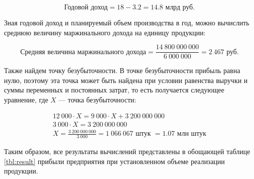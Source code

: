 \begin{equation}
    \textbf{Годовой доход} = 18 - 3.2 = 14.8 \text{ млрд руб.}
\end{equation}

Зная годовой доход и планируемый объем производства в год, можно вычислить среднюю величину маржинального дохода на единицу продукции:

\begin{equation}
    \textbf{Средняя величина маржинального дохода} = \frac{14\ 800\ 000\ 000}{6\ 000\ 000}  = 2\ 467 \text{ руб.}
\end{equation}

Также найдем точку безубыточности. В точке безубыточности прибыль равна нулю, поэтому эта точка может быть найдена при условии равенства выручки и суммы переменных и постоянных затрат, то есть получается следующее уравнение, где $X$ --- точка безубыточности:

\begin{equation}
    \begin{gathered}
        12\ 000 \cdot X = 9\ 000 \cdot X + 3\ 200\ 000\ 000 
        \\ 3\ 000 \cdot X = 3\ 200\ 000\ 000 
        \\ X = \frac{3\ 200\ 000\ 000}{3\ 000} = 1\ 066\ 067 \text{  штук } = 1.07 \text{  млн штук}
    \end{gathered}
\end{equation}


Таким образом, все результаты вычислений представлены в обощающей таблице \ref{tbl:result} прибыли предприятия при установленном объеме реализации продукции.

